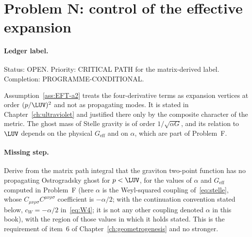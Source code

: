 \section{Problem N: control of the effective expansion}
\label{sec:status-N}

\paragraph{Ledger label.}
Status: OPEN. Priority: CRITICAL PATH for the matrix-derived label.
Completion: PROGRAMME-CONDITIONAL.

Assumption~\ref{ass:EFT-a2} treats the four-derivative terms as
expansion vertices at order \((p/\LUV)^2\) and not as propagating
modes. It is stated in Chapter~\ref{ch:ultraviolet} and justified
there only by the composite character of the metric. The ghost mass
of Stelle gravity is of order \(1/\sqrt{\alpha G}\), and its relation
to \(\LUV\) depends on the physical \(G_{\mathrm{eff}}\) and on
\(\alpha\), which are part of Problem~F.

\paragraph{Missing step.}
Derive from the matrix path integral that the graviton two-point
function has no propagating Ostrogradsky ghost for \(p<\LUV\), for
the values of \(\alpha\) and \(G_{\mathrm{eff}}\) computed in Problem~F (here \(\alpha\) is the Weyl-squared coupling
of~\eqref{eq:stelle}, whose \(C_{\mu\nu\rho\sigma}C^{\mu\nu\rho\sigma}\)
coefficient is \(-\alpha/2\); with the continuation convention stated
below, \(c_W=-\alpha/2\) in~\eqref{eq:W4}; it is not any other coupling
denoted \(\alpha\) in this book), with the region of those values in which it holds stated.
This is the requirement of item~6 of Chapter~\ref{ch:geometrogenesis}
and no stronger.

